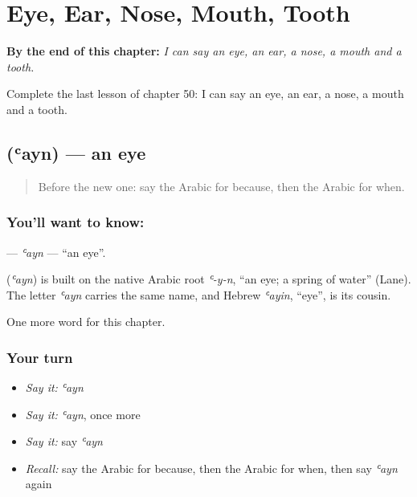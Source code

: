 
\chapter{Eye, Ear, Nose, Mouth, Tooth}
\label{ch:ar-eye-ear-nose-mouth-tooth}

\begin{chapteropening}
\textbf{By the end of this chapter:} \emph{I can say an eye, an ear, a nose, a mouth and a tooth.}

Complete the last lesson of chapter 50: I can say an eye, an ear, a nose, a mouth and a tooth.
\end{chapteropening}

\section[\texorpdfstring{\ar{عين} (ʿayn)}{عين (ʿayn)}]{ (ʿayn) — an eye}

\label{lesson:AR-C50-ayn}



\begin{quote}
Before the new one: say the Arabic for because, then the Arabic for when.
\end{quote}

\subsection*{You'll want to know: }
\textbf{} — \emph{ʿayn} — \textquotedblleft{}an eye\textquotedblright{}.

\begin{cousinweb}
\textbf{} (\emph{ʿayn}) is built on the native Arabic root \emph{ʿ-y-n}, \textquotedblleft{}an eye; a spring of water\textquotedblright{} (Lane). The letter \emph{ʿayn} carries the same name, and Hebrew \emph{ʿayin}, \textquotedblleft{}eye\textquotedblright{}, is its cousin.
\end{cousinweb}

\begin{grammarlens}[title={What you've built}]
One more word for this chapter.
\end{grammarlens}

\subsection*{Your turn}
\begin{itemize}
\raggedright
  \item \emph{Say it:} \emph{ʿayn}
  \item \emph{Say it:} \emph{ʿayn}, once more
  \item \emph{Say it:} say \emph{ʿayn}
  \item \emph{Recall:} say the Arabic for because, then the Arabic for when, then say \emph{ʿayn} again
\end{itemize}

